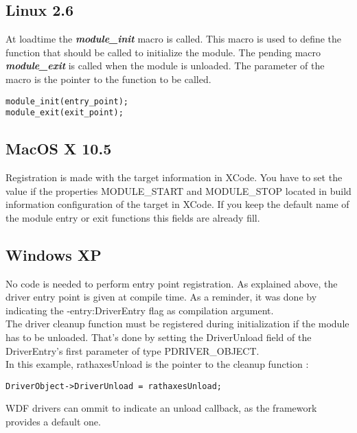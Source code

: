 \documentclass[11pt]{report}
\begin{document}
  \subsection{Linux 2.6}
  At loadtime the {\bf \it module\_init} macro is called. This macro
is used to define the function that should be called to initialize
the module. The pending macro {\bf \it module\_exit} is called when the
module is unloaded.
The parameter of the macro is the pointer to the function to be called.
    \begin{lstlisting}
module_init(entry_point);
module_exit(exit_point);
    \end{lstlisting}

  \subsection{MacOS X 10.5}
Registration is made with the target information in XCode. You have to set the value if the properties MODULE\_START and MODULE\_STOP located in build information configuration of the target in XCode. If you keep the default name of the module entry or exit functions this fields are already fill. \\
  \subsection{Windows XP}
        No code is needed to perform entry point registration.
  	As explained above, the driver entry point is given at compile time.
  	As a reminder, it was done by indicating the -entry:DriverEntry flag
  	as compilation argument.\\
  	The driver cleanup function must be registered during initialization
  	if the module has to be unloaded. That's done by setting the DriverUnload
  	field of the DriverEntry's first parameter of type PDRIVER\_OBJECT.\\
  	In this example, rathaxesUnload is the pointer to the cleanup function :
    \begin{lstlisting}
DriverObject->DriverUnload = rathaxesUnload;
    \end{lstlisting}
    WDF drivers can ommit to indicate an unload callback, as the framework
    provides a default one.
\end{document}
